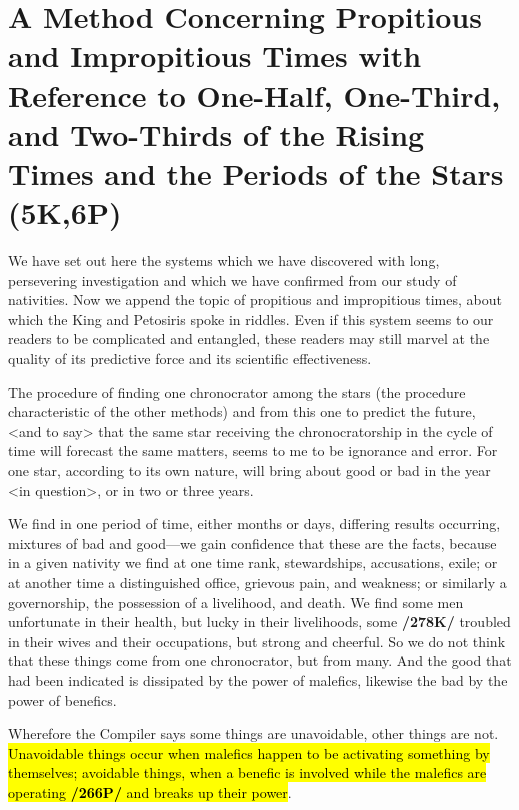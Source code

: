 \section{A Method Concerning Propitious and Impropitious Times with Reference to One-Half, One-Third, and Two-Thirds of the Rising Times and the Periods of the Stars (5K,6P)}

  
We have set out here the systems which we have discovered with long, persevering investigation and which we have confirmed from our study of nativities. Now we append the topic of propitious and
impropitious times, about which the King and Petosiris spoke in riddles. Even if this system seems to our readers to be complicated and entangled, these readers may still marvel at the quality of its predictive force and its scientific effectiveness. 

The  procedure of finding one chronocrator among the stars (the procedure characteristic of the other methods) and from this one to predict the future, <and to say> that the same star receiving the chronocratorship in the cycle of time will forecast the same matters, seems to me to be ignorance and error. For one star, according to its own nature, will bring about good or bad in the year <in question>, or in two or three years. 

We find in one period of time, either months or days, differing results occurring, mixtures of bad and good—we gain confidence that these are the facts, because in a given nativity we find at one time rank, stewardships, accusations, exile; or at another time a distinguished office, grievous pain, and weakness; or similarly a governorship, the possession of a livelihood, and death. We find some men unfortunate in their health, but lucky in their livelihoods, some \textbf{/278K/} troubled in their wives and their occupations, but strong and cheerful. So we do not think that these things come from one chronocrator, but from many. And the good that had been indicated is dissipated by the power of malefics, likewise the bad by the power of benefics.

Wherefore the Compiler says some things are unavoidable, other things are not. \hl{Unavoidable things occur when malefics happen to be activating something by themselves; avoidable things, when a benefic is involved while the malefics are operating \textbf{/266P/} and breaks up their power}. 

